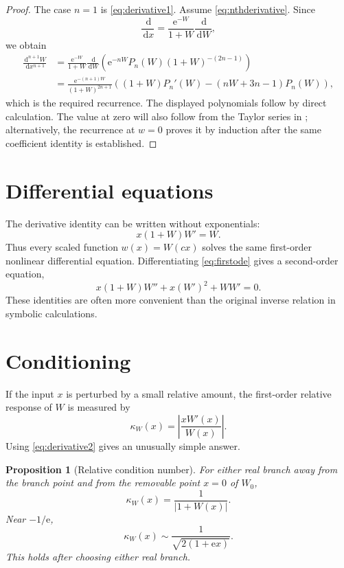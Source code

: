 \documentclass[11pt,openany]{book}
\newcommand{\e}{\mathrm{e}}
\newcommand{\dd}{\,\mathrm{d}}
\newcommand{\abs}[1]{\left|#1\right|}
\theoremstyle{plain}
\newtheorem{proposition}[theorem]{Proposition}
\theoremstyle{definition}
\theoremstyle{remark}
\begin{document}
\begin{proof}
The case \(n=1\) is \eqref{eq:derivative1}.  Assume
\eqref{eq:nthderivative}.  Since
\[
   \frac{\dd}{\dd x}=\frac{\e^{-W}}{1+W}\frac{\dd}{\dd W},
\]
we obtain
\begin{align*}
 \frac{\dd^{n+1}W}{\dd x^{n+1}}
 &=\frac{\e^{-W}}{1+W}\frac{\dd}{\dd W}
   \left(\e^{-nW}P_n(W)(1+W)^{-(2n-1)}\right)\\
 &=\frac{\e^{-(n+1)W}}{(1+W)^{2n+1}}
   \left((1+W)P_n'(W)-(nW+3n-1)P_n(W)\right),
\end{align*}
which is the required recurrence.  The displayed polynomials follow by direct
calculation.  The value at zero will also follow from the Taylor series in
; alternatively, the recurrence at \(w=0\) proves it by
induction after the same coefficient identity is established.
\end{proof}

\section{Differential equations}
The derivative identity can be written without exponentials:
\begin{equation}\label{eq:firstode}
       x(1+W)W'=W.
\end{equation}
Thus every scaled function \(w(x)=W(cx)\) solves the same first-order nonlinear
differential equation.  Differentiating \eqref{eq:firstode} gives a second-order
equation,
\begin{equation}\label{eq:secondode}
 x(1+W)W''+x(W')^2+W W'=0.
\end{equation}
These identities are often more convenient than the original inverse relation in
symbolic calculations.

\section{Conditioning}\label{sec:conditioning}
If the input \(x\) is perturbed by a small relative amount, the first-order
relative response of \(W\) is measured by
\[
  \kappa_W(x)=\abs{\frac{xW'(x)}{W(x)}}.
\]
Using \eqref{eq:derivative2} gives an unusually simple answer.

\begin{proposition}[Relative condition number]\label{prop:condition}
For either real branch away from the branch point and from the removable point
\(x=0\) of \(W_0\),
\[
       \kappa_W(x)=\frac1{\abs{1+W(x)}}.
\]
Near \(-1/\e\),
\[
       \kappa_W(x)\sim \frac1{\sqrt{2(1+\e x)}}.
\]
This holds after choosing either real branch.
\end{proposition}
\end{document}
